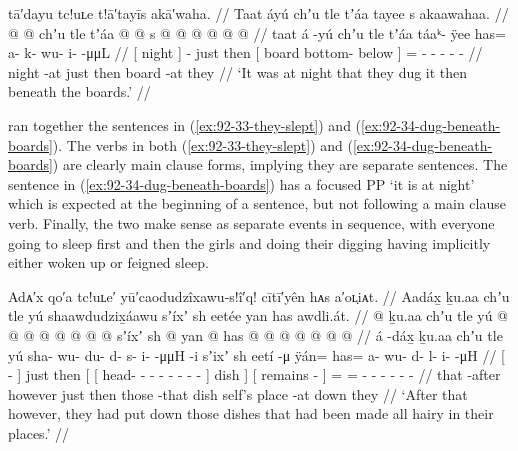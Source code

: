 \ex\label{ex:92-34-dug-beneath-boards}%
%
\begingl
	\glpreamble	tā′dayu tc!uʟe t!ā′tayīs akā′waha. //
	\glpreamble	Taat áyú chʼu tle tʼáa tayee s akaawahaa. //
	\gla	{}  @ {} {}  @ {}
		chʼu tle {} tʼáa  @ {} @ {} {}
		s @  @ {} @ {} @ {} @ {} @ {} //
	\glb	{} taat {} {} á -yú
		chʼu tle {} tʼáa táaᵏ- ÿee {} {}
		has= a- k- wu- i-  -μμL //
	\glc	{}[ night \· {}]  -
		just then {}[ board bottom- below \· {}]
		= - - - -  - //
	\gld	{} night -at {}  {}
		just then {} board  {} -at {}
		they  {} {} {} {} {} //
	\glft	‘It was at night that they dug it then beneath the boards.’
		//
\endgl
\xe

\citeauthor{swanton:1909} ran together the sentences in (\ref{ex:92-33-they-slept}) and (\ref{ex:92-34-dug-beneath-boards}).
The verbs in both (\ref{ex:92-33-they-slept}) and (\ref{ex:92-34-dug-beneath-boards}) are clearly main clause forms, implying they are separate sentences.
The sentence in (\ref{ex:92-34-dug-beneath-boards}) has a focused PP  ‘it is at night’ which is expected at the beginning of a sentence, but not following a main clause verb.
Finally, the two make sense as separate events in sequence, with everyone going to sleep first and then the girls and doing their digging having implicitly either woken up or feigned sleep.

\ex\label{ex:92-35-put-down-hairy-dishes-in-their-places}%
%
\begingl
	\glpreamble	Adᴀ′x qo′a tc!uʟe′ yū′caodudzîxawu-s!î′q! cītī′yên hᴀs a′oʟ̣iᴀt. //
	\glpreamble	Aadáx̱ ḵu.aa chʼu tle yú shaawdudzix̱áawu sʼíxʼ sh eetée yan has awdli.át.  //
	\gla	{}  @ {} {} ḵu.aa
		chʼu tle {} yú
			{}  @ {} @ {} @ {} @ {} @ {} @ {} @ {} @ {} {}
			sʼíxʼ {}
		{} sh  @ {} {}
		yan @ has @  @ {} @ {} @ {} @ {} @ {} @ {} //
	\glb	{} á -dáx̱ {} ḵu.aa
		chʼu tle {} yú
			{} sha- wu- du- d- s- i-  -μμH -i {}
			sʼixʼ {}
		{} sh eetí -μ {}
		ÿán= has= a- wu- d- l- i-  -μH //
	\glc	{}[  - {}] 
		just then {}[ 
			{}[ head- - - - - -
				 - - {}]
			dish {}]
		{}[  remains - {}]
		= = - - - - -
			 - //
	\gld	{} that -after {} however
		just then {} those
			{}  {} {} {} {} {} {} {} -that {}
			dish {}
		{} self’s place -at {}
		down they  {} {} {} {} {} {} //
	\glft	‘After that however, they had put down those dishes that had been made all hairy in their places.’
		//
\endgl
\xe

